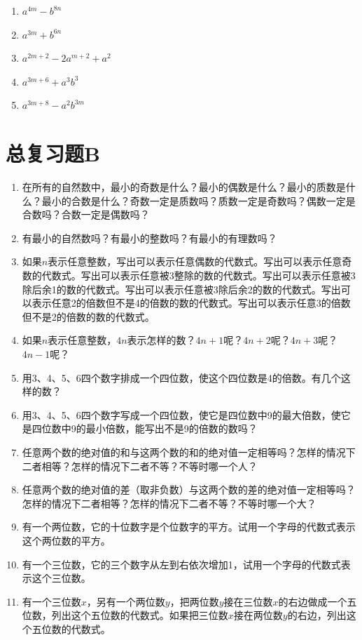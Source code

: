\begin{enumerate}[start=92]
\item
  \(a^{4m} - b^{8n}\)
\item
  \(a^{3m} + b^{6n}\)
\item
  \(a^{2m + 2} - 2a^{m + 2} + a^2\)
\item
  \(a^{3m + 6} + a^{3}b^{3}\)
\item
  \(a^{3m + 8} - a^{2}b^{3m}\)
\end{enumerate}

\chapter{总复习题B}

\begin{enumerate}
\item
  在所有的自然数中，最小的奇数是什么？最小的偶数是什么？最小的质数是什么？最小的合数是什么？奇数一定是质数吗？质数一定是奇数吗？偶数一定是合数吗？合数一定是偶数吗？
\item
  有最小的自然数吗？有最小的整数吗？有最小的有理数吗？
\item
  如果\(n\)表示任意整数，写出可以表示任意偶数的代数式。写出可以表示任意奇数的代数式。写出可以表示任意被3整除的数的代数式。写出可以表示任意被3除后余1的数的代数式。写出可以表示任意被3除后余2的数的代数式。写出可以表示任意2的倍数但不是4的倍数的数的代数式。写出可以表示任意3的倍数但不是2的倍数的数的代数式。
\item
  如果\(n\)表示任意整数，\(4n\)表示怎样的数？\(4n + 1\)呢？\(4n + 2\)呢？\(4n + 3\)呢？\(4n - 1\)呢？
\item
  用3、4、5、6四个数字排成一个四位数，使这个四位数是4的倍数。有几个这样的数？
\item
  用3、4、5、6四个数字写成一个四位数，使它是四位数中9的最大倍数，使它是四位数中9的最小倍数，能写出不是9的倍数的数吗？
\item
  任意两个数的绝对值的和与这两个数的和的绝对值一定相等吗？怎样的情况下二者相等？怎样的情况下二者不等？不等时哪一个人？
\item
  任意两个数的绝对值的差（取非负数）与这两个数的差的绝对值一定相等吗？怎样的情况下二者相等？怎样的情况下二者不等？不等时哪一个大？
\item
  有一个两位数，它的十位数字是个位数字的平方。试用一个字母的代数式表示这个两位数的平方。
\item
  有一个三位数，它的三个数字从左到右依次增加1，试用一个字母的代数式表示这个三位数。
\item
  有一个三位数\(x\)，另有一个两位数\(y\)，把两位数\(y\)接在三位数\(x\)的右边做成一个五位数，列出这个五位数的代数式。如果把三位数\(x\)接在两位数\(y\)的右边，列出这个五位数的代数式。

\end{enumerate}

